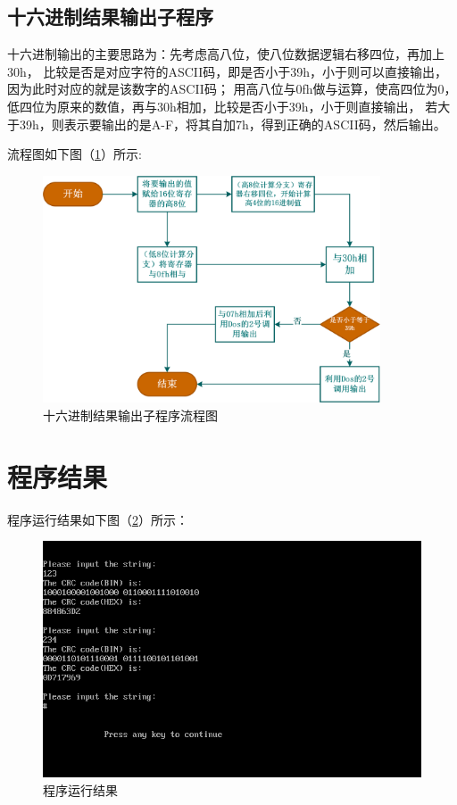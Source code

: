 \documentclass[UTF-8, a4paper, 12pt]{ctexart}
\begin{document}
\subsection{十六进制结果输出子程序}
十六进制输出的主要思路为：先考虑高八位，使八位数据逻辑右移四位，再加上30h，
比较是否是对应字符的ASCII码，即是否小于39h，小于则可以直接输出，
因为此时对应的就是该数字的ASCII码；
用高八位与0fh做与运算，使高四位为0，低四位为原来的数值，再与30h相加，比较是否小于39h，小于则直接输出，
若大于39h，则表示要输出的是A-F，将其自加7h，得到正确的ASCII码，然后输出。

流程图如下图（\ref{hex}）所示:
\begin{figure}[htbp]
    \centering
    \includegraphics[width=10cm]{fig/f6.png}
    \caption{十六进制结果输出子程序流程图}
    \label{hex}
\end{figure}



\newpage

\section{程序结果}
程序运行结果如下图（\ref{2}）所示：
\begin{figure}[htbp]
    \centering
    \includegraphics[width=12cm]{fig/f2}
    \caption{程序运行结果}
    \label{2}
\end{figure}
\end{document}
